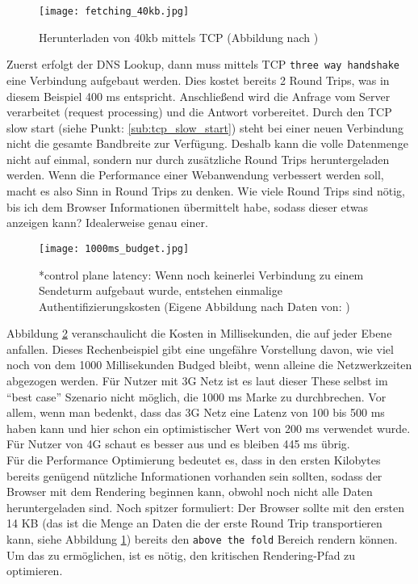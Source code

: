 		\begin{figure}[htbp]
			\begin{center}
				\texttt{[image: fetching\_40kb.jpg]}
				\caption{Herunterladen von 40kb mittels TCP (Abbildung nach \autocite{grigorikTCP})}
				\label{fig:fetching_40kb}
			\end{center}
		\end{figure}

		Zuerst erfolgt der DNS Lookup, dann muss mittels TCP \texttt{three way handshake} eine Verbindung aufgebaut werden. Dies kostet bereits 2 Round Trips, was in diesem Beispiel 400 ms entspricht. Anschließend wird die Anfrage vom Server verarbeitet (request processing) und die Antwort vorbereitet.
		Durch den TCP slow start (siehe Punkt: \ref{sub:tcp_slow_start}) steht bei einer neuen Verbindung nicht die gesamte Bandbreite zur Verfügung. Deshalb kann die volle Datenmenge nicht auf einmal, sondern nur durch zusätzliche Round Trips heruntergeladen werden. Wenn die Performance einer Webanwendung verbessert werden soll, macht es also Sinn in Round Trips zu denken. Wie viele Round Trips sind nötig, bis ich dem Browser Informationen übermittelt habe, sodass dieser etwas anzeigen kann? Idealerweise genau einer. 
		
		\begin{figure}[htbp]
			\begin{center}
				\texttt{[image: 1000ms\_budget.jpg]}
				\caption{*control plane latency: Wenn noch keinerlei Verbindung zu einem Sendeturm aufgebaut wurde, entstehen einmalige Authentifizierungskosten (Eigene Abbildung nach Daten von: \autocite{venturebeat}\autocite[p. 7, 12]{grigorikRadio})}
				\label{fig:1000ms_budget}
			\end{center}
		\end{figure}

		Abbildung \ref{fig:1000ms_budget} veranschaulicht die Kosten in Millisekunden, die auf jeder Ebene anfallen. Dieses Rechenbeispiel gibt eine ungefähre Vorstellung davon, wie viel noch von dem 1000 Millisekunden Budged bleibt, wenn alleine die Netzwerkzeiten abgezogen werden. Für Nutzer mit 3G Netz ist es laut dieser These selbst im "`best case"' Szenario nicht möglich, die 1000 ms Marke zu durchbrechen. Vor allem, wenn man bedenkt, dass das 3G Netz eine Latenz von 100 bis 500 ms haben kann und hier schon ein optimistischer Wert von 200 ms verwendet wurde. Für Nutzer von 4G schaut es besser aus und es bleiben 445 ms übrig.\\
		Für die Performance Optimierung bedeutet es, dass in den ersten Kilobytes bereits genügend nützliche Informationen vorhanden sein sollten, sodass der Browser mit dem Rendering beginnen kann, obwohl noch nicht alle Daten heruntergeladen sind. Noch spitzer formuliert: Der Browser sollte mit den ersten 14 KB (das ist die Menge an Daten die der erste Round Trip transportieren kann, siehe Abbildung \ref{fig:fetching_40kb}) bereits den \texttt{above the fold} Bereich rendern können. Um das zu ermöglichen, ist es nötig, den kritischen Rendering-Pfad zu optimieren.
		
